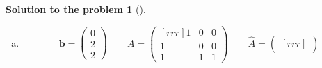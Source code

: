 \documentclass[12pt,a4]{article}
\newtheorem{solution}{Solution to the problem}
\newcommand{\bb}{{\mathbf b}}
\newcommand{\bu}{{\mathbf u}}
\newcommand{\answer}[1]{\textbf{Answer:} #1}
\begin{document}
\begin{solution}[]
\begin{enumerate}[(a)]
\[\qquad
\hat \bu_1 = \frac1{\sqrt2}\begin{pmatrix} 1 \\ 1 \end{pmatrix}
\quad
\hat \bu_2 = \frac1{\sqrt2}\begin{pmatrix} 1 \\ -1 \end{pmatrix}
\]
\[
C^+ = \hat U \Sigma^+ \hat V^\top = 
\frac1{\sqrt2}
\begin{pmatrix}
1 & 1 \\
1 & -1 \\
\end{pmatrix}
\begin{pmatrix}
1/\sqrt2 & 0 \\
0 & 0
\end{pmatrix}
\begin{pmatrix}
1 & 0 \\
0 & 1 \\
\end{pmatrix}
= \frac12
\begin{pmatrix}
1 & 0 \\
1 & 0 \\
\end{pmatrix}
\]
\answer{$
A^+ = \frac14
\begin{pmatrix} 1 \\ 1 \\ 1 \\ 1 \end{pmatrix}
\qquad
B^+ =
\begin{pmatrix}
0 & 1 \\
1 & 0 \\
0 & 0 \\
\end{pmatrix}
\qquad
C^+ = 
\frac12
\begin{pmatrix}
1 & 0 \\
1 & 0 \\
\end{pmatrix}
$}
	\item 
\[
\bb = 
\begin{pmatrix}
0 \\ 2 \\ 2
\end{pmatrix}
\qquad
A = \begin{pmatrix}[rrr]
1 & 0 & 0 \\ 1 & 0 & 0 \\ 1 & 1 & 1
\end{pmatrix}
\qquad
\hat A = 
\begin{pmatrix}[rrr]

\end{pmatrix}\]
\end{enumerate}
\end{solution}
\end{document}

